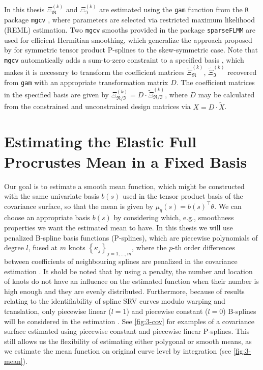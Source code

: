 In this thesis  $\Xi^{(k)}_\Re$ and $\Xi^{(k)}_\Im$ are estimated using the \texttt{gam} function from the \texttt{R} package \texttt{mgcv} \parencite{Wood2017}, where parameters are selected via restricted maximum likelihood (REML) estimation.
Two \texttt{mgcv} smooths provided in the package \texttt{sparseFLMM} \parencite{sparseFLMM} are used for efficient Hermitian smoothing, which generalize the approach proposed by \cite{CederbaumScheiplGreven2018} for symmetric tensor product P-splines to the skew-symmetric case.
Note that \texttt{mgcv} automatically adds a sum-to-zero constraint to a specified basis \parencite[see][175]{Wood2017}, which makes it is necessary to transform the coefficient matrices $\widetilde \Xi_\Re^{(k)}$, $\widetilde \Xi_\Im^{(k)}$ recovered from \texttt{gam} with an appropriate transformation matrix $D$.
The coefficient matrices in the specified basis are given by $\Xi_{\Re/\Im}^{(k)} = D \cdot \widetilde \Xi_ {\Re/\Im}^{(k)}$, where $D$ may be calculated from the constrained and unconstrained design matrices via $X = D \cdot \widetilde X$.

\section{Estimating the Elastic Full Procrustes Mean in a Fixed Basis}
\label{sec:3-mean}
Our goal is to estimate a smooth mean function, which might be constructed with the same univariate basis $b(s)$ used in the tensor product basis of the covariance surface, so that the mean is given by $\mu_q(s) = b(s)^\top \theta$.
We can choose an appropriate basis $b(s)$ by considering which, e.g., smoothness properties we want the estimated mean to have.
In this thesis we will use penalized B-spline basis functions (P-splines), which are piecewise polynomials of degree $l$, fused at $m$ knots $\left\{\kappa_j\right\}_{j=1,\dots,m}$, where the $p$-th order differences between coefficients of neighbouring splines are penalized in the covariance estimation \parencite[see][Chap.~8.1]{FahrmeierEtAl2013}.
It shold be noted that by using a penalty, the number and location of knots do not have an influence on the estimated function when their number is high enough and they are evenly distributed.
Furthermore, because of results relating to the identifiability of spline SRV curves modulo warping and translation, only piecewise linear ($l = 1$) and piecewise constant ($l = 0$) B-splines will be considered in the estimation \parencite[see][]{Steyer2021}.
See \cref{fig:3-cov} for examples of a covariance surface estimated using piecewise constant and piecewise linear P-splines.
This still allows us the flexibility of estimating either polygonal or smooth means, as we estimate the mean function on original curve level by integration (see \cref{fig:3-mean}). 

